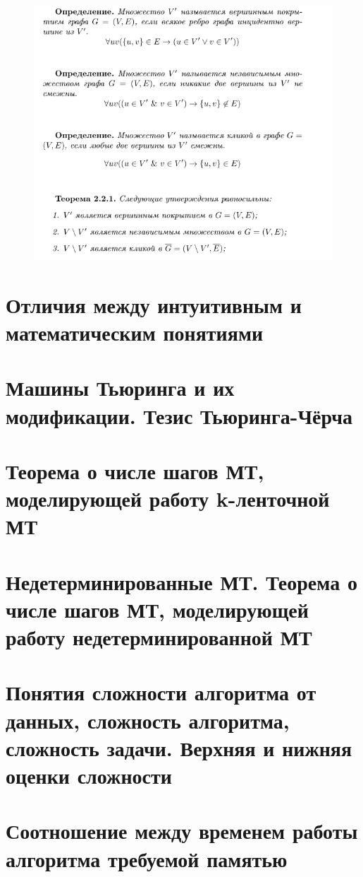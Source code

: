 \documentclass[40pt]{article}
\begin{document}
    \begin{figure}[h!]
        \includegraphics[width=1\textwidth]{./images/21.png}
        \centering
    \end{figure}

\section{Отличия между интуитивным и математическим понятиями}
\section{Машины Тьюринга и их модификации. Тезис Тьюринга-Чёрча}
\section{Теорема о числе шагов МТ, моделирующей работу k-ленточной МТ}
\section{Недетерминированные МТ.  Теорема о числе шагов МТ, моделирующей работу недетерминированной МТ}
\section{Понятия сложности алгоритма от данных, сложность алгоритма, сложность задачи. Верхняя и нижняя оценки сложности}
\section{Соотношение между временем работы алгоритма требуемой памятью}
\end{document}
